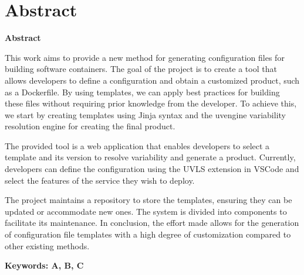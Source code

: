 \documentclass[../main.tex]{subfiles}
\begin{document}
\makeatletter
\renewenvironment{abstract}{%
    \if@twocolumn
      \section*{Abstract \\}%
    \else %
    \begin{flushright}
        {\filleft\Huge\bfseries\fontsize{48pt}{12}\selectfont Abstract\vspace{\z@}}%
        \end{flushright}
      \quotation
    \fi}
    {\if@twocolumn\else\endquotation\fi}
\makeatother
\begin{abstract}

  This work aims to provide a new method for generating configuration files for building software containers. The goal of the project is to create a tool that allows developers to define a configuration and obtain a customized product, such as a Dockerfile. By using templates, we can apply best practices for building these files without requiring prior knowledge from the developer. To achieve this, we start by creating templates using Jinja syntax and the uvengine variability resolution engine for creating the final product.

  The provided tool is a web application that enables developers to select a template and its version to resolve variability and generate a product. Currently, developers can define the configuration using the UVLS extension in VSCode and select the features of the service they wish to deploy.
  
  The project maintains a repository to store the templates, ensuring they can be updated or accommodate new ones. The system is divided into components to facilitate its maintenance. In conclusion, the effort made allows for the generation of configuration file templates with a high degree of customization compared to other existing methods.

\bfseries{\large{Keywords:}} A, B, C

\end{abstract}
\end{document}
